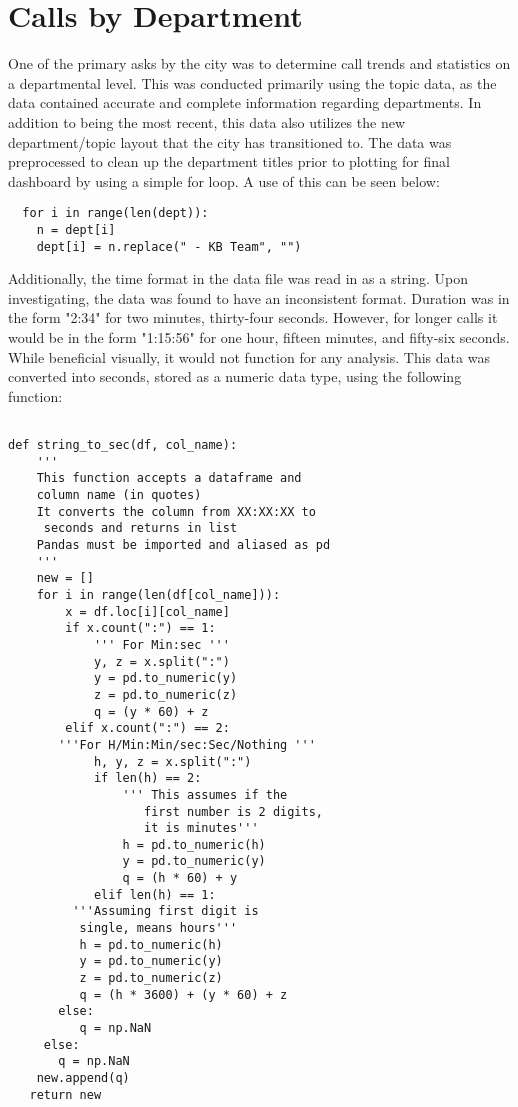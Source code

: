 \documentclass[11pt,twocolumn]{article}
\begin{document}
\section{Calls by Department}
One of the primary asks by the city was to determine call trends and statistics on a departmental level.  This was conducted primarily using the topic data, as the data contained accurate and complete information regarding departments.  In addition to being the most recent, this data also utilizes the new department/topic layout that the city has transitioned to.  The data was preprocessed to clean up the department titles prior to plotting for final dashboard by using a simple for loop.  A use of this can be seen below:

  \begin{verbatim}
  for i in range(len(dept)):
    n = dept[i]
    dept[i] = n.replace(" - KB Team", "")
  \end{verbatim}

\par
Additionally, the time format in the data file was read in as a string.  Upon investigating, the data was found to have an inconsistent format.  Duration was in the form "2:34" for two minutes, thirty-four seconds.  However, for longer calls it would be in the form "1:15:56" for one hour, fifteen minutes, and fifty-six seconds.  While beneficial visually, it would not function for any analysis.  This data was converted into seconds, stored as a numeric data type, using the following function:

  \begin{verbatim}
  
def string_to_sec(df, col_name):
    ''' 
    This function accepts a dataframe and 
    column name (in quotes)
    It converts the column from XX:XX:XX to
     seconds and returns in list
    Pandas must be imported and aliased as pd
    '''
    new = []
    for i in range(len(df[col_name])):
        x = df.loc[i][col_name]
        if x.count(":") == 1:
            ''' For Min:sec '''
            y, z = x.split(":")
            y = pd.to_numeric(y)
            z = pd.to_numeric(z)
            q = (y * 60) + z
        elif x.count(":") == 2:
       '''For H/Min:Min/sec:Sec/Nothing '''
            h, y, z = x.split(":")
            if len(h) == 2:
                ''' This assumes if the
                   first number is 2 digits,
                   it is minutes'''
                h = pd.to_numeric(h)
                y = pd.to_numeric(y)
                q = (h * 60) + y
            elif len(h) == 1:
         '''Assuming first digit is 
          single, means hours'''
          h = pd.to_numeric(h)
          y = pd.to_numeric(y)
          z = pd.to_numeric(z)
          q = (h * 3600) + (y * 60) + z
       else:
          q = np.NaN
     else:
       q = np.NaN
    new.append(q)
   return new
  \end{verbatim}
\end{document}

